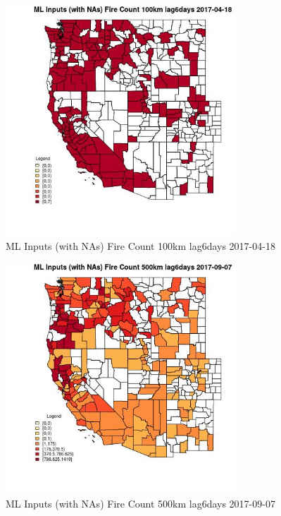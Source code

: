 \begin{figure} 
\centering  
\includegraphics[width=0.77\textwidth]{Code_Outputs/Report_ML_input_PM25_Step4_part_e_de_duplicated_aves_compiled_2019-05-20wNAs_CountyFire_Count_100km_lag6daysMean2017-04-18.jpg} 
\caption{\label{fig:Report_ML_input_PM25_Step4_part_e_de_duplicated_aves_compiled_2019-05-20wNAsCountyFire_Count_100km_lag6daysMean2017-04-18}ML Inputs (with NAs) Fire Count 100km lag6days 2017-04-18} 
\end{figure} 
 

\begin{figure} 
\centering  
\includegraphics[width=0.77\textwidth]{Code_Outputs/Report_ML_input_PM25_Step4_part_e_de_duplicated_aves_compiled_2019-05-20wNAs_CountyFire_Count_500km_lag6daysMean2017-09-07.jpg} 
\caption{\label{fig:Report_ML_input_PM25_Step4_part_e_de_duplicated_aves_compiled_2019-05-20wNAsCountyFire_Count_500km_lag6daysMean2017-09-07}ML Inputs (with NAs) Fire Count 500km lag6days 2017-09-07} 
\end{figure} 
 


